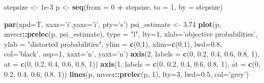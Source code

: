 \documentclass[
]{article}
\newenvironment{Shaded}{\begin{snugshade}}{\end{snugshade}}
\newcommand{\DataTypeTok}[1]{\textcolor[rgb]{0.13,0.29,0.53}{#1}}
\newcommand{\DecValTok}[1]{\textcolor[rgb]{0.00,0.00,0.81}{#1}}
\newcommand{\FloatTok}[1]{\textcolor[rgb]{0.00,0.00,0.81}{#1}}
\newcommand{\KeywordTok}[1]{\textcolor[rgb]{0.13,0.29,0.53}{\textbf{#1}}}
\newcommand{\NormalTok}[1]{#1}
\newcommand{\OperatorTok}[1]{\textcolor[rgb]{0.81,0.36,0.00}{\textbf{#1}}}
\newcommand{\StringTok}[1]{\textcolor[rgb]{0.31,0.60,0.02}{#1}}
\begin{document}
\begin{Shaded}
\begin{Highlighting}[]
\NormalTok{stepsize <-}\StringTok{ }\FloatTok{1e-3}
\NormalTok{p <-}\StringTok{ }\KeywordTok{seq}\NormalTok{(}\DataTypeTok{from =} \DecValTok{0} \OperatorTok{+}\StringTok{ }\NormalTok{stepsize, }\DataTypeTok{to =} \DecValTok{1}\NormalTok{, }\DataTypeTok{by =}\NormalTok{ stepsize)}

\KeywordTok{par}\NormalTok{(}\DataTypeTok{xpd=}\NormalTok{T, }\DataTypeTok{xaxs=}\StringTok{'i'}\NormalTok{,}\DataTypeTok{yaxs=}\StringTok{'i'}\NormalTok{, }\DataTypeTok{pty=}\StringTok{'s'}\NormalTok{)}
\NormalTok{psi_estimate <-}\StringTok{ }\FloatTok{3.74}
\KeywordTok{plot}\NormalTok{(p, mvecr}\OperatorTok{::}\KeywordTok{prelec}\NormalTok{(p, psi_estimate), }\DataTypeTok{type =} \StringTok{"l"}\NormalTok{, }\DataTypeTok{lty=}\DecValTok{1}\NormalTok{, }
     \DataTypeTok{xlab=}\StringTok{'objective probabilities'}\NormalTok{, }
     \DataTypeTok{ylab =} \StringTok{"distorted probabilities"}\NormalTok{, }
     \DataTypeTok{ylim =} \KeywordTok{c}\NormalTok{(}\DecValTok{0}\NormalTok{,}\DecValTok{1}\NormalTok{), }\DataTypeTok{xlim=}\KeywordTok{c}\NormalTok{(}\DecValTok{0}\NormalTok{,}\DecValTok{1}\NormalTok{),}
     \DataTypeTok{lwd=}\FloatTok{0.8}\NormalTok{, }\DataTypeTok{col=}\StringTok{'black'}\NormalTok{,  }\DataTypeTok{asp=}\DecValTok{1}\NormalTok{, }\DataTypeTok{xaxt=}\StringTok{'n'}\NormalTok{, }\DataTypeTok{yaxt=}\StringTok{'n'}\NormalTok{)}
\KeywordTok{axis}\NormalTok{(}\DecValTok{2}\NormalTok{,}
     \DataTypeTok{labels =} \KeywordTok{c}\NormalTok{(}\DecValTok{0}\NormalTok{, }\FloatTok{0.2}\NormalTok{, }\FloatTok{0.4}\NormalTok{, }\FloatTok{0.6}\NormalTok{, }\FloatTok{0.8}\NormalTok{, }\DecValTok{1}\NormalTok{),}
     \DataTypeTok{at =} \KeywordTok{c}\NormalTok{(}\DecValTok{0}\NormalTok{, }\FloatTok{0.2}\NormalTok{, }\FloatTok{0.4}\NormalTok{, }\FloatTok{0.6}\NormalTok{, }\FloatTok{0.8}\NormalTok{, }\DecValTok{1}\NormalTok{))}
\KeywordTok{axis}\NormalTok{(}\DecValTok{1}\NormalTok{,}
     \DataTypeTok{labels =} \KeywordTok{c}\NormalTok{(}\DecValTok{0}\NormalTok{, }\FloatTok{0.2}\NormalTok{, }\FloatTok{0.4}\NormalTok{, }\FloatTok{0.6}\NormalTok{, }\FloatTok{0.8}\NormalTok{, }\DecValTok{1}\NormalTok{),}
     \DataTypeTok{at =} \KeywordTok{c}\NormalTok{(}\DecValTok{0}\NormalTok{, }\FloatTok{0.2}\NormalTok{, }\FloatTok{0.4}\NormalTok{, }\FloatTok{0.6}\NormalTok{, }\FloatTok{0.8}\NormalTok{, }\DecValTok{1}\NormalTok{))}
\KeywordTok{lines}\NormalTok{(p, mvecr}\OperatorTok{::}\KeywordTok{prelec}\NormalTok{(p, }\DecValTok{1}\NormalTok{), }\DataTypeTok{lty=}\DecValTok{3}\NormalTok{, }\DataTypeTok{lwd=}\FloatTok{0.5}\NormalTok{, }\DataTypeTok{col=}\StringTok{'grey'}\NormalTok{)}
\end{Highlighting}
\end{Shaded}
\end{document}
